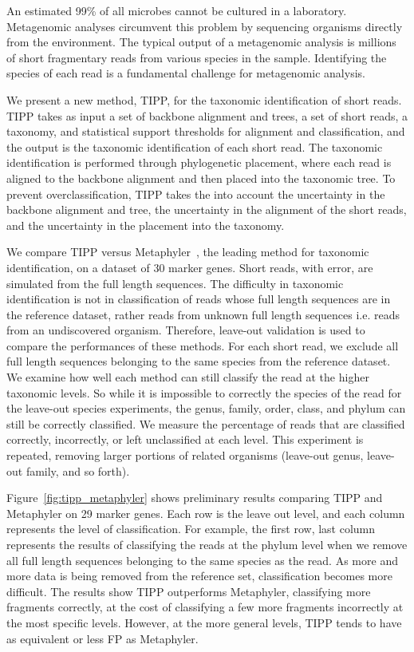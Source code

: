 \documentclass[times, 10pt]{article}
\begin{document}
An estimated 99\% of all microbes cannot be cultured in a laboratory. Metagenomic analyses circumvent this problem by sequencing organisms directly from the environment.  The typical output of a metagenomic analysis is millions of short fragmentary reads from various species in the sample.  Identifying the species of each read is a fundamental challenge for metagenomic analysis.

We present a new method, TIPP, for the taxonomic identification of short reads.  TIPP takes as input a set of backbone alignment and trees, a set of short reads, a taxonomy, and statistical support thresholds for alignment and classification, and the output is the taxonomic identification of each short read.  The taxonomic identification is performed through phylogenetic placement, where each read is aligned to the backbone alignment and then placed into the taxonomic tree.  To prevent overclassification, TIPP takes the into account the uncertainty in the backbone alignment and tree, the uncertainty in the alignment of the short reads, and the uncertainty in the placement into the taxonomy.

We compare TIPP versus Metaphyler~\cite{Liu2011}, the leading method for taxonomic identification, on a dataset of 30 marker genes.  Short reads, with error, are simulated from the full length sequences.  The difficulty in taxonomic identification is not in classification of reads whose full length sequences are in the reference dataset, rather reads from unknown full length sequences i.e. reads from an undiscovered organism.  Therefore, leave-out validation is used to compare the performances of these methods.  For each short read, we exclude all full length sequences belonging to the same species from the reference dataset.   We examine how well each method can still classify the read at the higher taxonomic levels.  So while it is impossible to correctly the species of the read for the leave-out species experiments, the genus, family, order, class, and phylum can still be correctly classified.  We measure the percentage of reads that are classified correctly, incorrectly, or left unclassified at each level.  This experiment is repeated, removing larger portions of related organisms (leave-out genus, leave-out family, and so forth).

Figure~\ref{fig:tipp_metaphyler} shows preliminary results comparing TIPP and Metaphyler on 29 marker genes.  Each row is the leave out level, and each column represents the level of classification.  For example, the first row, last column represents the results of classifying the reads at the phylum level when we remove all full length sequences belonging to the same species as the read.  As more and more data is being removed from the reference set, classification becomes more difficult.  The results show TIPP outperforms Metaphyler, classifying more fragments correctly, at the cost of classifying a few more fragments incorrectly at the most specific levels.  However, at the more general levels, TIPP tends to have as equivalent or less FP as Metaphyler.
\end{document}
